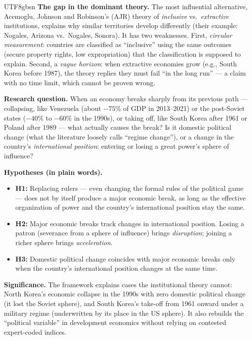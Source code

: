 \documentclass[10pt]{article}
\begin{document}
\begin{CJK}{UTF8}{gbsn}
\noindent\textbf{The gap in the dominant theory.} The most influential alternative, Acemoglu, Johnson and Robinson's (AJR) theory of \emph{inclusive} vs.\ \emph{extractive} institutions, explains why similar territories develop differently (their example: Nogales, Arizona vs.\ Nogales, Sonora). It has two weaknesses. First, \emph{circular measurement}: countries are classified as ``inclusive'' using the same outcomes (secure property rights, low expropriation) that the classification is supposed to explain. Second, a \emph{vague horizon}: when extractive economies grow (e.g., South Korea before 1987), the theory replies they must fail ``in the long run'' --- a claim with no time limit, which cannot be proven wrong.

\noindent\textbf{Research question.} When an economy breaks sharply from its previous path --- collapsing, like Venezuela (about $-75\%$ of GDP in 2013--2021) or the post-Soviet states ($-40\%$ to $-60\%$ in the 1990s), or taking off, like South Korea after 1961 or Poland after 1989 --- what actually causes the break? Is it domestic political change (what the literature loosely calls ``regime change''), or a change in the country's \emph{international position}: entering or losing a great power's sphere of influence?

\noindent\textbf{Hypotheses (in plain words).}
\begin{itemize}
    \item \textbf{H1:} Replacing rulers --- even changing the formal rules of the political game --- does not by itself produce a major economic break, as long as the effective organization of power and the country's international position stay the same.
    \item \textbf{H2:} Major economic breaks track changes in international position. Losing a patron (severance from a sphere of influence) brings \emph{disruption}; joining a richer sphere brings \emph{acceleration}.
    \item \textbf{H3:} Domestic political change coincides with major economic breaks only when the country's international position changes at the same time.
\end{itemize}

\noindent\textbf{Significance.} The framework explains cases the institutional theory cannot: North Korea's economic collapse in the 1990s with zero domestic political change (it lost the Soviet sphere), and South Korea's take-off from 1961 onward under a military regime (underwritten by its place in the US sphere). It also rebuilds the ``political variable'' in development economics without relying on contested expert-coded indices.


\end{CJK}
\end{document}
